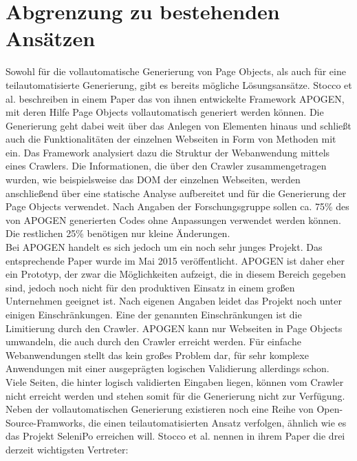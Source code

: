 \section{Abgrenzung zu bestehenden Ansätzen}
\label{sec:abgrenzung_zu_bestehenden_ansaetzen}
Sowohl für die vollautomatische Generierung von Page Objects, als auch für eine teilautomatisierte Generierung, gibt es bereits mögliche Lösungsansätze. 
Stocco et al. \cite{stocco_why_2015} beschreiben in einem Paper das von ihnen entwickelte Framework APOGEN, mit deren Hilfe Page Objects vollautomatisch generiert werden können. Die Generierung geht dabei weit über das Anlegen von Elementen hinaus und schließt auch die Funktionalitäten der einzelnen Webseiten in Form von Methoden mit ein.
Das Framework analysiert dazu die Struktur der Webanwendung mittels eines Crawlers. Die Informationen, die über den Crawler zusammengetragen wurden, wie beispielsweise das DOM der einzelnen Webseiten, werden anschließend über eine statische Analyse aufbereitet und für die Generierung der Page Objects verwendet.
Nach Angaben der Forschungsgruppe sollen ca. 75\% des von APOGEN generierten Codes ohne Anpassungen verwendet werden können. Die restlichen 25\% benötigen nur kleine Änderungen.\\
Bei APOGEN handelt es sich jedoch um ein noch sehr junges Projekt. Das entsprechende Paper wurde im Mai 2015 veröffentlicht. APOGEN ist daher eher ein Prototyp, der zwar die Möglichkeiten aufzeigt, die in diesem Bereich gegeben sind, jedoch noch nicht für den produktiven Einsatz in einem großen Unternehmen geeignet ist.
Nach eigenen Angaben leidet das Projekt noch unter einigen Einschränkungen. Eine der genannten Einschränkungen ist die Limitierung durch den Crawler.
APOGEN kann nur Webseiten in Page Objects umwandeln, die auch durch den Crawler erreicht werden.
Für einfache Webanwendungen stellt das kein großes Problem dar, für sehr komplexe Anwendungen mit einer ausgeprägten logischen Validierung allerdings schon.
Viele Seiten, die hinter logisch validierten Eingaben liegen, können vom Crawler nicht erreicht werden und stehen somit für die Generierung nicht zur Verfügung.\\
Neben der vollautomatischen Generierung existieren noch eine Reihe von Open-Source-Framworks,
die einen teilautomatisierten Ansatz verfolgen, ähnlich wie es das Projekt SeleniPo erreichen will.
Stocco et al. \cite{stocco_why_2015} nennen in ihrem Paper die drei derzeit wichtigsten Vertreter:

